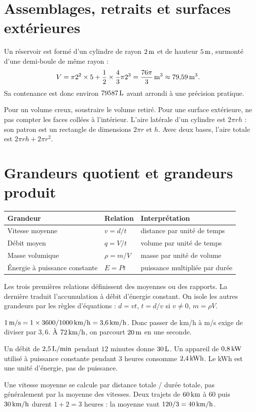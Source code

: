 \documentclass[../cours_3e.tex]{subfiles}
\begin{document}
\section{Assemblages, retraits et surfaces extérieures}
\begin{exemple}
Un réservoir est formé d'un cylindre de rayon $2\,\mathrm{m}$ et de hauteur $5\,\mathrm{m}$, surmonté d'une demi-boule de même rayon :
\[V=\pi2^2\times5+\frac12\times\frac43\pi2^3
=\frac{76\pi}{3}\,\mathrm{m^3}\approx79{,}59\,\mathrm{m^3}.\]
Sa contenance est donc environ $79587\,\mathrm{L}$ avant arrondi à une précision pratique.
\end{exemple}
Pour un volume creux, soustraire le volume retiré. Pour une surface extérieure, ne pas compter les faces collées à l'intérieur. L'aire latérale d'un cylindre est $2\pi rh$ : son patron est un rectangle de dimensions $2\pi r$ et $h$. Avec deux bases, l'aire totale est $2\pi rh+2\pi r^2$.
\section{Grandeurs quotient et grandeurs produit}
\begin{center}
\begin{tabularx}{\textwidth}{lXX}
\toprule Grandeur & Relation & Interprétation\\\midrule
Vitesse moyenne & $v=d/t$ & distance par unité de temps\\
Débit moyen & $q=V/t$ & volume par unité de temps\\
Masse volumique & $\rho=m/V$ & masse par unité de volume\\
Énergie à puissance constante & $E=Pt$ & puissance multipliée par durée\\\bottomrule
\end{tabularx}
\end{center}
Les trois premières relations définissent des moyennes ou des rapports. La dernière traduit l'accumulation à débit d'énergie constant. On isole les autres grandeurs par les règles d'équations : $d=vt$, $t=d/v$ si $v\ne0$, $m=\rho V$.
\begin{demonstration}
$1\,\mathrm{m/s}=1\times3600/1000\,\mathrm{km/h}=3{,}6\,\mathrm{km/h}$. Donc passer de km/h à m/s exige de diviser par $3{,}6$. À $72\,\mathrm{km/h}$, on parcourt $20\,\mathrm{m}$ en une seconde.
\end{demonstration}
Un débit de $2{,}5\,\mathrm{L/min}$ pendant $12$ minutes donne $30\,\mathrm{L}$. Un appareil de $0{,}8\,\mathrm{kW}$ utilisé à puissance constante pendant $3$ heures consomme $2{,}4\,\mathrm{kWh}$. Le kWh est une unité d'énergie, pas de puissance.
\begin{attention}
Une vitesse moyenne se calcule par distance totale / durée totale, pas généralement par la moyenne des vitesses. Deux trajets de $60\,\mathrm{km}$ à $60$ puis $30\,\mathrm{km/h}$ durent $1+2=3$ heures : la moyenne vaut $120/3=40\,\mathrm{km/h}$.
\end{attention}
\end{document}
